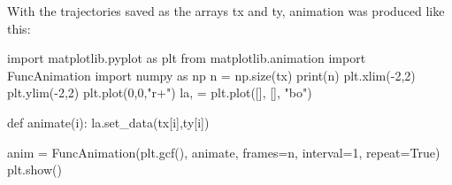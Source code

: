 With the trajectories saved as the arrays tx and ty, animation was produced like this:
\begin{python}
import matplotlib.pyplot as plt
from matplotlib.animation import FuncAnimation
import numpy as np
n = np.size(tx)
print(n)
plt.xlim(-2,2)
plt.ylim(-2,2)
plt.plot(0,0,"r+")
la, = plt.plot([], [], "bo")

def animate(i):
    la.set_data(tx[i],ty[i])
    
anim = FuncAnimation(plt.gcf(), animate, frames=n, interval=1, repeat=True)
plt.show()
\end{python}















